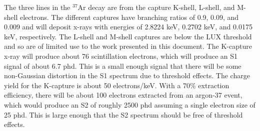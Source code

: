 The three lines in the $^{37}$Ar decay are from the capture K-shell, L-shell, and M-shell electrons. The different captures have branching ratios of 0.9, 0.09, and 0.009 and will deposit x-rays with energies of 2.8224 keV, 0.2702 keV, and 0.0175 keV, respectively. The L-shell and M-shell captures are below the LUX threshold and so are of limited use to the work presented in this document. The K-capture x-ray will produce about 76 scintillation electrons, which will produce an S1 signal of about 6.7 phd. This is a small enough signal that there will be some non-Gaussian distortion in the S1 spectrum due to threshold effects. The charge yield for the K-capture is about 50 electrons/keV. With a 70\% extraction efficiency, there will be about 100 electrons extracted from an argon-37 event, which would produce an S2 of roughly 2500 phd assuming a single electron size of 25 phd. This is large enough that the S2 spectrum should be free of threshold effects.
